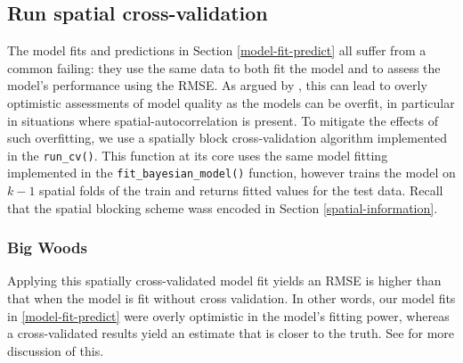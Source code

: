 \documentclass[12pt]{article}
\newenvironment{Shaded}{\begin{snugshade}}{\end{snugshade}}
\newcommand{\CommentTok}[1]{\textcolor[rgb]{0.56,0.35,0.01}{\textit{#1}}}
\newcommand{\DataTypeTok}[1]{\textcolor[rgb]{0.13,0.29,0.53}{#1}}
\newcommand{\KeywordTok}[1]{\textcolor[rgb]{0.13,0.29,0.53}{\textbf{#1}}}
\newcommand{\NormalTok}[1]{#1}
\newcommand{\OperatorTok}[1]{\textcolor[rgb]{0.81,0.36,0.00}{\textbf{#1}}}
\newcommand{\StringTok}[1]{\textcolor[rgb]{0.31,0.60,0.02}{#1}}
\begin{document}
\hypertarget{run-spatial-cross-validation}{%
\subsection{Run spatial
cross-validation}\label{run-spatial-cross-validation}}

The model fits and predictions in Section \ref{model-fit-predict} all
suffer from a common failing: they use the same data to both fit the
model and to assess the model's performance using the RMSE. As argued by
\citet{roberts_cross-validation_2017}, this can lead to overly
optimistic assessments of model quality as the models can be overfit, in
particular in situations where spatial-autocorrelation is present. To
mitigate the effects of such overfitting, we use a spatially block
cross-validation algorithm implemented in the \texttt{run\_cv()}. This
function at its core uses the same model fitting implemented in the
\texttt{fit\_bayesian\_model()} function, however trains the model on
\(k-1\) spatial folds of the train and returns fitted values for the
test data. Recall that the spatial blocking scheme wass encoded in
Section \ref{spatial-information}.

\hypertarget{big-woods-5}{%
\subsubsection{Big Woods}\label{big-woods-5}}

Applying this spatially cross-validated model fit yields an RMSE is
higher than that when the model is fit without cross validation. In
other words, our model fits in \ref{model-fit-predict} were overly
optimistic in the model's fitting power, whereas a cross-validated
results yield an estimate that is closer to the truth. See
\citet{allen_permutation_2020} for more discussion of this.

\begin{Shaded}
\end{Shaded}
\end{document}

